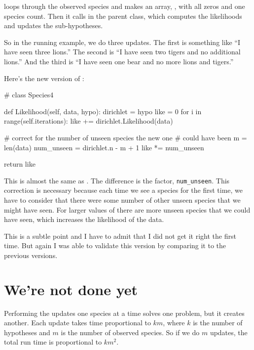 \documentclass[12pt]{book}
\theoremstyle{exercise}
\begin{document}
 loops through the observed species and makes an
array, , with all zeros and one species count.  Then
it calls  in the parent class, which computes
the likelihoods and updates the sub-hypotheses.

So in the running example, we do three updates.  The first
is something like ``I have seen three lions.''  The second is
``I have seen two tigers and no additional lions.''  And the third
is ``I have seen one bear and no more lions and tigers.''

Here's the new version of :

\begin{code}
# class Species4

    def Likelihood(self, data, hypo):
        dirichlet = hypo
        like = 0
        for i in range(self.iterations):
            like += dirichlet.Likelihood(data)

        # correct for the number of unseen species the new one
        # could have been
        m = len(data)
        num_unseen = dirichlet.n - m + 1
        like *= num_unseen

        return like
\end{code}

This is almost the same as .  The difference
is the factor, \verb"num_unseen".  This correction is necessary
because each time we see a species for the first time, we have to
consider that there were some number of other unseen species that
we might have seen.  For larger values of  there are more
unseen species that we could have seen, which increases the likelihood
of the data.

This is a subtle point and I have to admit that I did not get it right
the first time.  But again I was able to validate this version
by comparing it to the previous versions.


\section{We're not done yet}

\newcommand{\BigO}[1]{\mathcal{O}(#1)}

Performing the updates one species at a time solves one problem, but
it creates another.  Each update takes time proportional to $k m$,
where $k$ is the number of hypotheses and $m$ is the number of observed
species.  So if we do $m$ updates, the total run time is
proportional to $k m^2$. 
\end{document}
